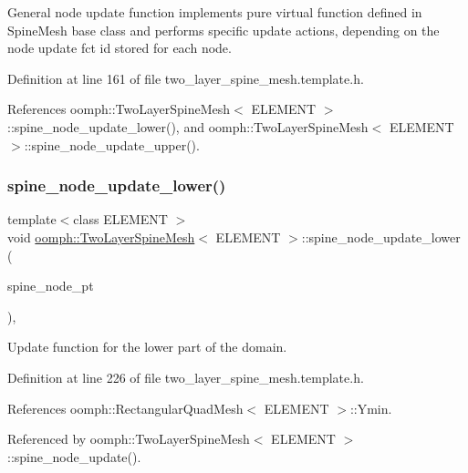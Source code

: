 General node update function implements pure virtual function defined in Spine\+Mesh base class and performs specific update actions, depending on the node update fct id stored for each node. 



Definition at line 161 of file two\+\_\+layer\+\_\+spine\+\_\+mesh.\+template.\+h.



References oomph\+::\+Two\+Layer\+Spine\+Mesh$<$ E\+L\+E\+M\+E\+N\+T $>$\+::spine\+\_\+node\+\_\+update\+\_\+lower(), and oomph\+::\+Two\+Layer\+Spine\+Mesh$<$ E\+L\+E\+M\+E\+N\+T $>$\+::spine\+\_\+node\+\_\+update\+\_\+upper().

\mbox{\label{classoomph_1_1TwoLayerSpineMesh_a7973ed642b9adff26bf531c76dade747}} 
\subsubsection{\texorpdfstring{spine\+\_\+node\+\_\+update\+\_\+lower()}{spine\_node\_update\_lower()}}
{\footnotesize\ttfamily template$<$class E\+L\+E\+M\+E\+NT $>$ \\
void \hyperlink{classoomph_1_1TwoLayerSpineMesh}{oomph\+::\+Two\+Layer\+Spine\+Mesh}$<$ E\+L\+E\+M\+E\+NT $>$\+::spine\+\_\+node\+\_\+update\+\_\+lower (\begin{DoxyParamCaption}\item[{Spine\+Node $\ast$}]{spine\+\_\+node\+\_\+pt }\end{DoxyParamCaption})\hspace{0.3cm}{\ttfamily [inline]}, {\ttfamily [protected]}}



Update function for the lower part of the domain. 



Definition at line 226 of file two\+\_\+layer\+\_\+spine\+\_\+mesh.\+template.\+h.



References oomph\+::\+Rectangular\+Quad\+Mesh$<$ E\+L\+E\+M\+E\+N\+T $>$\+::\+Ymin.



Referenced by oomph\+::\+Two\+Layer\+Spine\+Mesh$<$ E\+L\+E\+M\+E\+N\+T $>$\+::spine\+\_\+node\+\_\+update().

